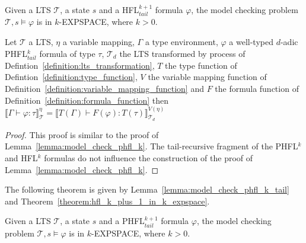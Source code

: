 \begin{theorem}{\cite{bruse2017space}}
    \label{theorem:hfl_k_plus_1_in_k_expspace}
    Given a LTS $\mathcal{T}$, a state $s$ and a HFL$^{k + 1}_{tail}$ formula $\varphi$, the model checking problem
    $\mathcal{T}, s \models \varphi$ is in $k$-EXPSPACE, where $k > 0$.
\end{theorem}

\begin{lemma}
    \label{lemma:model_check_phfl_k_tail}
    Let $\mathcal{T}$ a LTS, $\eta$ a variable mapping, $\Gamma$ a type environment, $\varphi$ a well-typed $d$-adic
    PHFL$^k_{tail}$ formula of type $\tau$, $\mathcal{T}_d$ the LTS transformed by process of
    Defintion~\ref{definition:lts_transformation}, $T$ the type function of Defintion~\ref{definition:type_function},
    $V$ the variable mapping function of Definition~\ref{definition:variable_mapping_function}
    and $F$ the formula function of Definition~\ref{definition:formula_function} then $\llbracket \Gamma \vdash
    \varphi \colon \tau \rrbracket^\eta_\mathcal{T} = \llbracket T(\Gamma) \vdash F(\varphi) \colon T(\tau)
    \rrbracket^{V(\eta)}_{\mathcal{T}_d}$
\end{lemma}

\begin{proof}
    This proof is similar to the proof of Lemma~\ref{lemma:model_check_phfl_k}. The tail-recursive fragment of the
    PHFL$^k$ and HFL$^k$ formulas do not influence the construction of the proof of
    Lemma~\ref{lemma:model_check_phfl_k}.
\end{proof}

The following theorem is given by Lemma~\ref{lemma:model_check_phfl_k_tail} and
Theorem~\ref{theorem:hfl_k_plus_1_in_k_expspace}.

\begin{theorem}
    \label{theorem:phfl_k_plus_1_tail_in_k_expspace}
    Given a LTS $\mathcal{T}$, a state $s$ and a PHFL$^{k + 1}_{tail}$ formula $\varphi$, the model checking problem
    $\mathcal{T}, s \models \varphi$ is in $k$-EXPSPACE, where $k > 0$.
\end{theorem}